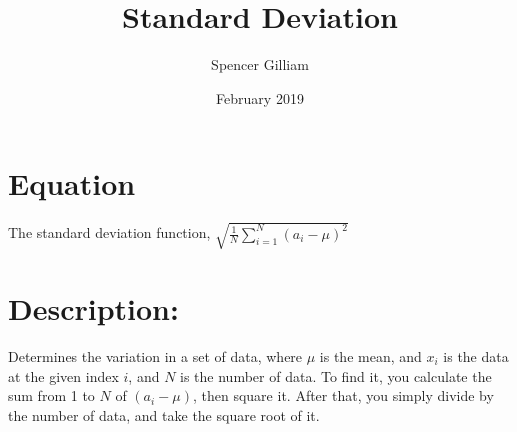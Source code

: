 \documentclass{article}
\title{Standard Deviation}
\author{Spencer Gilliam}
\date{February 2019}
\begin{document}
\maketitle

\section{Equation}
The standard deviation function, $\sqrt{\frac{1}{N}\sum\limits_{i=1}^N(a_i - \mu)^2}$
\section{Description:}
			Determines the variation in a set of data, where $\mu$ is the mean, and $x_i$ is the data at the given index $i$, and $N$ is the number of data. To find it, you calculate the sum from 1 to $N$ of $(a_i - \mu)$, then square it. After that, you simply divide by the number of data, and take the square root of it.
\end{document}
